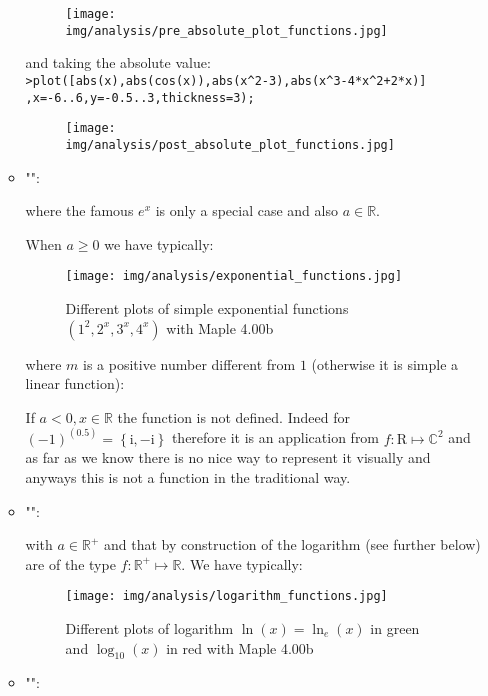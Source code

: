 \begin{enumerate}
\begin{itemize}
			\begin{figure}[H]
				\centering
				\texttt{[image: img/analysis/pre\_absolute\_plot\_functions.jpg]}
			\end{figure}
			
			and taking the absolute value:\\
			
			\texttt{>plot([abs(x),abs(cos(x)),abs(x\string^2-3),abs(x\string^3-4*x\string^2+2*x)]\\
			,x=-6..6,y=-0.5..3,thickness=3);}
			\begin{figure}[H]
				\centering
				\texttt{[image: img/analysis/post\_absolute\_plot\_functions.jpg]}
			\end{figure}
		
		\item "":
			
			where the famous $e^x$ is only a special case and also $a\in\mathbb{R}$.
			
			When $a\geq 0$ we have typically:
			\begin{figure}[H]
				\centering
				\texttt{[image: img/analysis/exponential\_functions.jpg]}
				\caption{Different plots of simple exponential functions $(1^2,2^x,3^x,4^x)$ with Maple 4.00b}
			\end{figure}
			where $m$ is a positive number different from $1$ (otherwise it is simple a linear function):
			
			If $a<0,x\in\mathbb{R}$ the function is not defined. Indeed for $(-1)^(0.5)=\left\lbrace \mathrm{i},	-\mathrm{i}	\right\rbrace$ therefore it is an application from $f:\mathrm{R}\mapsto\mathbb{C}^2$ and as far as we know there is no nice way to represent it visually and anyways this is not a function in the traditional way.
			
			\item "":
				
			with $a\in\mathbb{R}^{+}$ and that by construction of the logarithm (see further below) are of the type $f:\mathbb{R}^{+}\mapsto \mathbb{R}$.
			We have typically:
			\begin{figure}[H]
				\centering
				\texttt{[image: img/analysis/logarithm\_functions.jpg]}
				\caption{Different plots of logarithm $\ln(x)=\ln_e(x)$ in green and $\log_{10}(x)$ in red with Maple 4.00b}
			\end{figure}
			
			\item "":
			

\end{itemize}
\end{enumerate}
